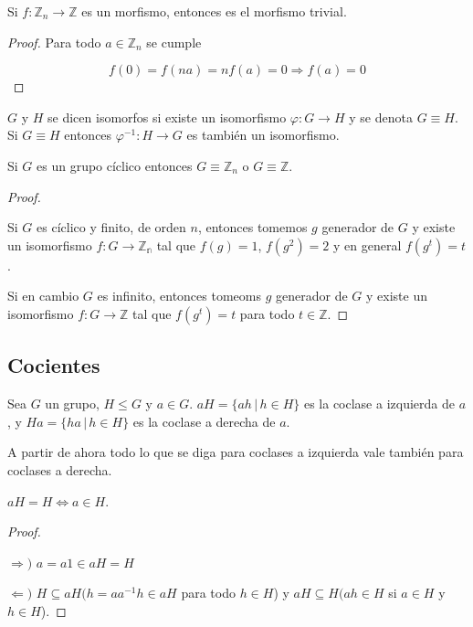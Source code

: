 \begin{obs}
Si $f: \mathbb{Z}_n \rightarrow \mathbb{Z}$ es un morfismo, entonces es el morfismo trivial.
\end{obs}

\begin{proof}
Para todo $a \in \mathbb{Z}_n$ se cumple

$$f(0) = f(na) = nf(a) = 0 \Rightarrow f(a) = 0$$
\end{proof}

\begin{defn}
$G$ y $H$ se dicen isomorfos si existe un isomorfismo $\varphi: G \rightarrow H$ y se denota $G \equiv H$. Si $G \equiv H$ entonces $\varphi^{-1}: H \rightarrow G$ es tambi\'en un isomorfismo.
\end{defn}

\begin{prop}
Si $G$ es un grupo c\'iclico entonces $G \equiv \mathbb{Z}_n$ o $G \equiv \mathbb{Z}$.
\end{prop}

\begin{proof}
$ $

Si $G$ es c\'iclico y finito, de orden $n$, entonces tomemos $g$ generador de $G$ y existe un isomorfismo $f: G \rightarrow \mathbb{Z_n}$ tal que $f(g) = 1$, $f(g^2) = 2$ y en general $f(g^t) = t$.

Si en cambio $G$ es infinito, entonces tomeoms $g$ generador de $G$ y existe un isomorfismo $f: G \rightarrow \mathbb{Z}$ tal que $f(g^t) = t$ para todo $t \in \mathbb{Z}$.
\end{proof}

\subsection{Cocientes}

\begin{defn}
Sea $G$ un grupo, $H \leq G$ y $a \in G$. $aH = \{ah \, | \, h \in H\}$ es la coclase a izquierda de $a$, y $Ha = \{ha \, | \, h \in H\}$ es la coclase a derecha de $a$.
\end{defn}

A partir de ahora todo lo que se diga para coclases a izquierda vale tambi\'en para coclases a derecha.

\begin{prop}
$aH = H \Leftrightarrow a \in H$.
\end{prop}

\begin{proof}
$ $

$\Rightarrow )$ $a = a1 \in aH = H$

$\Leftarrow )$ $H \subseteq aH (h = aa^{-1}h \in aH$ para todo $h \in H$) y $aH \subseteq H (ah \in H$ si $a \in H$ y $h \in H$).
\end{proof}

